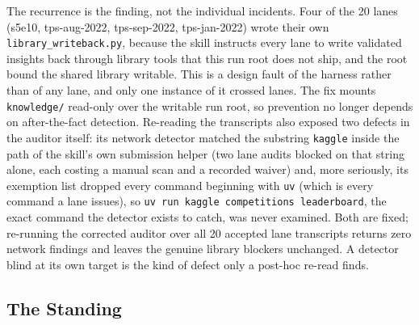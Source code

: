 \documentclass[11pt,a4paper]{article}
\begin{document}
The recurrence is the finding, not the individual incidents. Four of the 20 lanes (s5e10, tps-aug-2022, tps-sep-2022, tps-jan-2022) wrote their own \texttt{library\_writeback.py}, because the skill instructs every lane to write validated insights back through library tools that this run root does not ship, and the root bound the shared library writable. This is a design fault of the harness rather than of any lane, and only one instance of it crossed lanes. The fix mounts \texttt{knowledge/} read-only over the writable run root, so prevention no longer depends on after-the-fact detection. Re-reading the transcripts also exposed two defects in the auditor itself: its network detector matched the substring \texttt{kaggle} inside the path of the skill's own submission helper (two lane audits blocked on that string alone, each costing a manual scan and a recorded waiver) and, more seriously, its exemption list dropped every command beginning with \texttt{uv} (which is every command a lane issues), so \texttt{uv run kaggle competitions leaderboard}, the exact command the detector exists to catch, was never examined. Both are fixed; re-running the corrected auditor over all 20 accepted lane transcripts returns zero network findings and leaves the genuine library blockers unchanged. A detector blind at its own target is the kind of defect only a post-hoc re-read finds.

\subsection{The Standing}
\label{sec:winrates}
\end{document}
